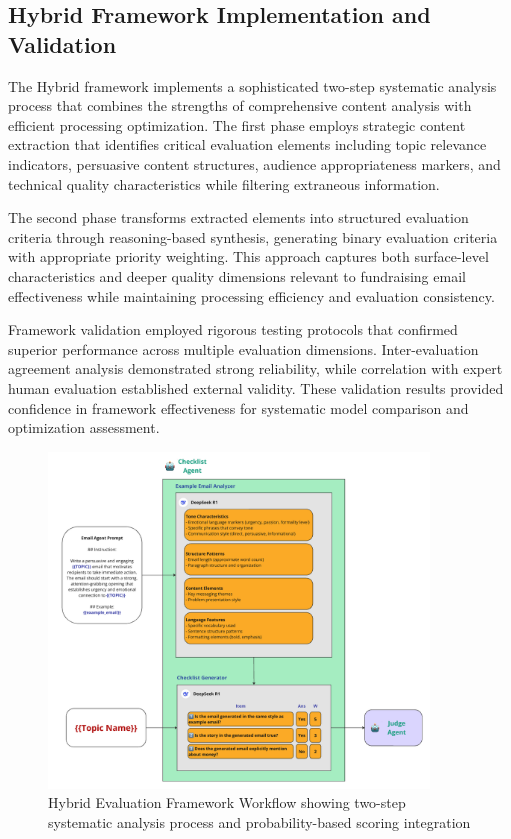 \subsection{Hybrid Framework Implementation and Validation}

The Hybrid framework implements a sophisticated two-step systematic analysis process that combines the strengths of comprehensive content analysis with efficient processing optimization. The first phase employs strategic content extraction that identifies critical evaluation elements including topic relevance indicators, persuasive content structures, audience appropriateness markers, and technical quality characteristics while filtering extraneous information.

The second phase transforms extracted elements into structured evaluation criteria through reasoning-based synthesis, generating binary evaluation criteria with appropriate priority weighting. This approach captures both surface-level characteristics and deeper quality dimensions relevant to fundraising email effectiveness while maintaining processing efficiency and evaluation consistency.

Framework validation employed rigorous testing protocols that confirmed superior performance across multiple evaluation dimensions. Inter-evaluation agreement analysis demonstrated strong reliability, while correlation with expert human evaluation established external validity. These validation results provided confidence in framework effectiveness for systematic model comparison and optimization assessment.

\begin{figure}[H]
    \centering
    \includegraphics[width=0.9\textwidth]{figures/hybrid-checklist.png}
    \caption{Hybrid Evaluation Framework Workflow showing two-step systematic analysis process and probability-based scoring integration}
    \label{fig:hybrid-framework-workflow}
\end{figure}

